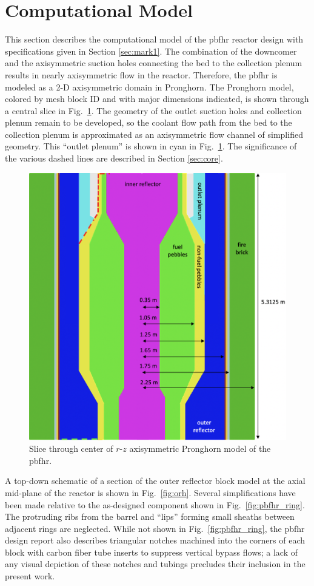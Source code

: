 \section{Computational Model}
\label{sec:pbfhr_model}

This section describes the computational model of the \gls{pbfhr} reactor design with specifications given in Section \ref{sec:mark1}. The combination of the downcomer and the axisymmetric suction holes connecting the bed to the collection plenum results in nearly axisymmetric flow in the reactor. Therefore, the \gls{pbfhr} is modeled as a 2-D axisymmetric domain in Pronghorn. The Pronghorn model, colored by mesh block ID and with major dimensions indicated, is shown through a central slice in Fig.\ \ref{fig:pbfhr_slice}. The geometry of the outlet suction holes and collection plenum remain to be developed, so the coolant flow path from the bed to the collection plenum is approximated as an axisymmetric flow channel of simplified geometry. This ``outlet plenum'' is shown in cyan in Fig.\ \ref{fig:pbfhr_slice}. The significance of the various dashed lines are described in Section \ref{sec:core}.

\begin{figure}[h!]
\centering
\hspace{1cm}
\includegraphics[width=0.5\linewidth]{figs/pbfhr_slice.png}
\caption{Slice through center of $r$-$z$ axisymmetric Pronghorn model of the \gls{pbfhr}.}
\label{fig:pbfhr_slice}
\end{figure}

A top-down schematic of a section of the outer reflector block model at the axial mid-plane of the reactor is shown in Fig.\ \ref{fig:orh}. Several simplifications have been made relative to the as-designed component shown in Fig.\ \ref{fig:pbfhr_ring}. The protruding ribs from the barrel and ``lips'' forming small sheaths between adjacent rings are neglected. While not shown in Fig.\ \ref{fig:pbfhr_ring}, the \gls{pbfhr} design report also describes triangular notches machined into the corners of each block with carbon fiber tube inserts to suppress vertical bypass flows; a lack of any visual depiction of these notches and tubings precludes their inclusion in the present work. 

